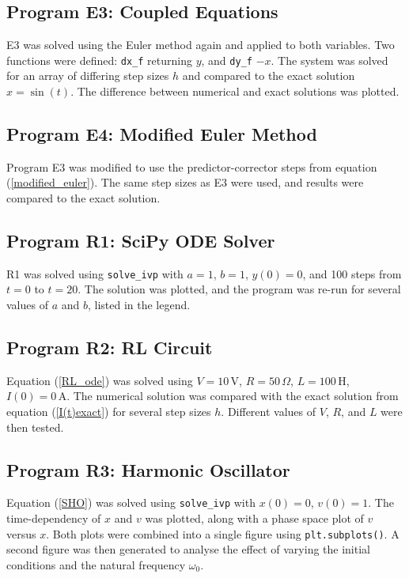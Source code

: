 \documentclass[12pt,a4paper]{article}
\begin{document}
	\subsection*{Program E3: Coupled Equations}
	E3 was solved using the Euler method again and applied to both variables.
	Two functions were defined: \texttt{dx\_f} returning \(y\), and \texttt{dy\_f} \(-x\). The system was solved for an array of differing step sizes \(h\) and compared to the exact solution \(x = \sin(t)\).
	The difference between numerical and exact solutions was plotted.
	
	\subsection*{Program E4: Modified Euler Method}
	Program E3 was modified to use the predictor-corrector steps from equation (\ref{modified_euler}).
	The same step sizes as E3 were used, and results were compared to the exact solution.
	
	\subsection*{Program R1: SciPy ODE Solver}
	R1 was solved using \texttt{solve\_ivp} with \(a=1\), \(b=1\), \(y(0)=0\), and 100 steps from \(t=0\) to \(t=20\). The solution was plotted, and the program was re-run for several values of \(a\) and \(b\), listed in the legend.
	
	\subsection*{Program R2: RL Circuit}
	Equation (\ref{RL_ode}) was solved using \(V = 10\,\text{V}\), \(R = 50\,\Omega\), \(L = 100\,\text{H}\), \(I(0) = 0\,\text{A}\). The numerical solution was compared with the exact solution from equation (\ref{I(t)exact}) for several step sizes \(h\). Different values of \(V\), \(R\), and \(L\) were then tested.
	
	\subsection*{Program R3: Harmonic Oscillator}
	Equation (\ref{SHO}) was solved using \texttt{solve\_ivp} with \(x(0)=0\), \(v(0)=1\). The time-dependency of \(x\) and \(v\) was plotted, along with a phase space plot of \(v\) versus \(x\). Both plots were combined into a single figure using \texttt{plt.subplots()}. A second figure was then generated to analyse the effect of varying the initial conditions and the natural frequency \(\omega_0\).
	
\end{document}
